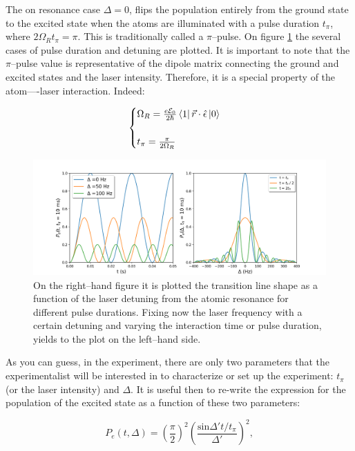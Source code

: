 The on resonance case $\Delta=0$, flips the population entirely from the ground state to the excited state when the atoms are illuminated with a pulse duration $t_{\pi}$, where $2\Omega_{R}t_{\pi} = \pi$. This is traditionally called a $\pi$--pulse. On figure \ref{rabi_osc} the several cases of pulse duration and detuning are plotted. It is important to note that the $\pi$--pulse value is representative of the dipole matrix connecting the ground and excited states and the laser intensity. Therefore, it is a special property of the atom----laser interaction. Indeed:

\begin{equation}
    \begin{cases}
        \Omega_{R} = \frac{e\mathcal{E}_{0}}{2\hbar} \bra{1} \vec{r} \cdot \hat{\epsilon} \ket{0} \\
        \\
        t_{\pi} = \frac{\pi}{2\Omega_{R}}
    \end{cases}
\end{equation}

\begin{figure}[h]
\centering
\includegraphics[width=\linewidth]{./plots/Rabi_Oscillations/rabi.png}
\caption{On the right--hand figure it is plotted the transition line shape as a function of the laser detuning from the atomic resonance for different pulse durations. Fixing now the laser frequency with a certain detuning and varying the interaction time or pulse duration, yields to the plot on the left--hand side.}
\label{rabi_osc}
\end{figure}

As you can guess, in the experiment, there are only two parameters that the experimentalist will be interested in to characterize or set up the experiment: $t_{\pi}$ (or the laser intensity) and $\Delta$. It is useful then to re-write the expression for the population of the excited state as a function of these two parameters:

\begin{equation}\label{p_excited}
    P_{e}(t, \Delta) = \left(\frac{\pi}{2}\right)^{2} \left( \frac{ \textrm{sin}\Delta' t/t_{\pi}} {\Delta'} \right)^{2},
\end{equation}

